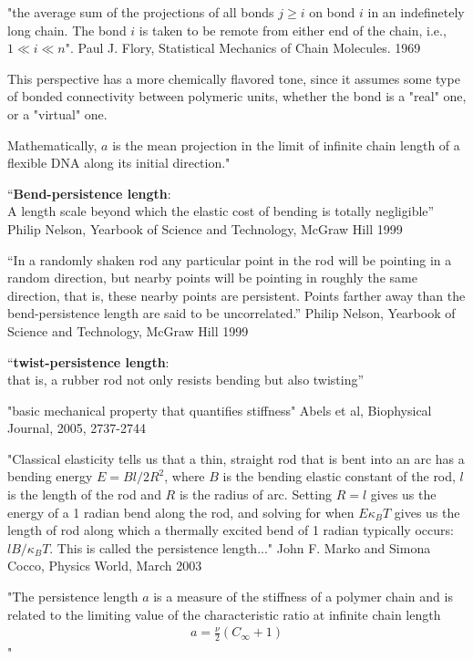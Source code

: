 "the average sum of the projections of all bonds $ j \geq i$  on bond
$i$ in an indefinetely long chain. The bond $i$ is taken to be remote
from either end of the chain, i.e., $1 \ll i \ll n$". Paul J. Flory,
Statistical Mechanics of Chain Molecules. 1969

This perspective has a more chemically flavored tone, since it assumes
some type of bonded  connectivity between polymeric units, whether the
bond is a "real" one, or a "virtual" one.



Mathematically, $a$ is the mean
projection in the limit of infinite chain length of a flexible DNA
along its initial direction." \cite{olson1995}



``\textbf{Bend-persistence length}:\\ 
A length scale beyond which the elastic cost of bending is totally
negligible'' Philip Nelson, Yearbook of Science and Technology, McGraw
Hill 1999

``In a randomly shaken rod any particular point in the rod will be
pointing in a random direction, but nearby points will be pointing in
roughly the same direction, that is, these nearby points are
persistent. Points farther away than the bend-persistence length are
said to be uncorrelated.'' Philip Nelson, Yearbook of Science and
Technology, McGraw Hill 1999

``\textbf{twist-persistence length}:\\
that is, a rubber rod not only resists bending but also twisting''

"basic mechanical property that quantifies stiffness"
Abels et al, Biophysical Journal, 2005, 2737-2744


"Classical elasticity tells us that a thin, straight rod that is bent
into an arc has a bending energy $E=Bl/2R^2$, where $B$ is the bending
elastic constant of the rod, $l$ is the length of the rod and $R$ is
the radius of arc. Setting $R=l$ gives us the energy of a 1 radian
bend along the rod, and solving for when $E \kappa_{B}T$ gives us the
length of rod along which a thermally excited bend of 1 radian
typically occurs: $l B/\kappa_{B}T$. This is called the persistence
length..." John F. Marko and Simona Cocco, Physics World, March 2003



"The persistence length $a$ is a measure of the stiffness of a polymer
chain and is related to the limiting value of the characteristic ratio
at infinite chain length
\begin{gather}
a=\frac{\nu}{2}(C_{\infty}+1)
\end{gather}
"

